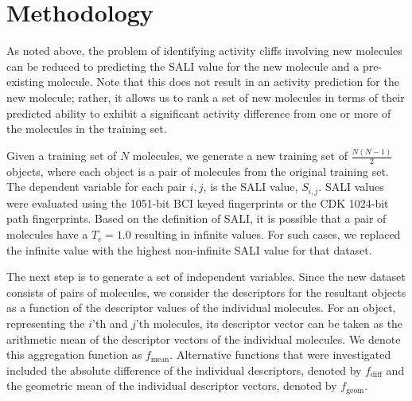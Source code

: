 \documentclass[letterpaper, 12pt]{article}
\begin{document}

\section{Methodology}
\label{sec:methodology}
As noted above, the problem of identifying activity cliffs involving
new molecules can be reduced to predicting the SALI value for the new
molecule and a pre-existing molecule. Note that this does not result
in an activity prediction for the new molecule; rather, it allows us
to rank a set of new molecules in terms of their predicted ability to
exhibit a significant activity difference from one or more of the
molecules in the training set.

Given a training set of $N$ molecules, we generate a new training set
of $\frac{N(N-1)}{2}$ objects, where each object is a pair of
molecules from the original training set. The dependent variable for
each pair $i,j$, is the SALI value, $S_{i,j}$. SALI values were
evaluated using the 1051-bit BCI keyed fingerprints or the CDK
1024-bit path fingerprints. Based on the
definition of SALI, it is possible that a pair of molecules have a
$T_c = 1.0$ resulting in infinite values. For such cases, we replaced
the infinite value with the highest non-infinite SALI value for that
dataset. 

The next step is to generate a set of independent variables. Since the
new dataset consists of pairs of molecules, we consider the
descriptors for the resultant objects as a function of the descriptor
values of the individual molecules. For an object, representing the
$i$'th and $j$'th molecules, its descriptor vector can be taken as the
arithmetic mean of the descriptor vectors of the individual
molecules. We denote this aggregation function as
$f_{\textrm{mean}}$. Alternative functions that were investigated included
the absolute difference of the individual descriptors, denoted by
$f_{\textrm{diff}}$ and the geometric mean of the individual
descriptor vectors, denoted by $f_{\textrm{geom}}$. 
\end{document}
